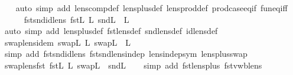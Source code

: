 \begin{isabellebody}
%
\isadelimproof
\ \ %
\endisadelimproof
%
\isatagproof
{}\isamarkupfalse%
\ {\isacharparenleft}auto\ simp\ add{\isacharcolon}\ lens{\isacharunderscore}comp{\isacharunderscore}def\ lens{\isacharunderscore}plus{\isacharunderscore}def\ lens{\isacharunderscore}prod{\isacharunderscore}def\ prod{\isachardot}case{\isacharunderscore}eq{\isacharunderscore}if\ fun{\isacharunderscore}eq{\isacharunderscore}iff{\isacharparenright}%
\endisatagproof
{\isafoldproof}%
%
\isadelimproof
\isanewline
%
\endisadelimproof
\ \ \ \ \isanewline
{}\isamarkupfalse%
\ fst{\isacharunderscore}snd{\isacharunderscore}id{\isacharunderscore}lens{\isacharcolon}\ {\isachardoublequoteopen}fst\isactrlsub L\ {\isacharplus}\isactrlsub L\ snd\isactrlsub L\ {\isacharequal}\ {}\isactrlsub L{\isachardoublequoteclose}\isanewline
%
\isadelimproof
\ \ %
\endisadelimproof
%
\isatagproof
{}\isamarkupfalse%
\ {\isacharparenleft}auto\ simp\ add{\isacharcolon}\ lens{\isacharunderscore}plus{\isacharunderscore}def\ fst{\isacharunderscore}lens{\isacharunderscore}def\ snd{\isacharunderscore}lens{\isacharunderscore}def\ id{\isacharunderscore}lens{\isacharunderscore}def{\isacharparenright}%
\endisatagproof
{\isafoldproof}%
%
\isadelimproof
\isanewline
%
\endisadelimproof
\ \ \isanewline
{}\isamarkupfalse%
\ swap{\isacharunderscore}lens{\isacharunderscore}idem{\isacharcolon}\ {\isachardoublequoteopen}swap\isactrlsub L\ {\isacharsemicolon}\isactrlsub L\ swap\isactrlsub L\ {\isacharequal}\ {}\isactrlsub L{\isachardoublequoteclose}\isanewline
%
\isadelimproof
\ \ %
\endisadelimproof
%
\isatagproof
{}\isamarkupfalse%
\ {\isacharparenleft}simp\ add{\isacharcolon}\ fst{\isacharunderscore}snd{\isacharunderscore}id{\isacharunderscore}lens\ fst{\isacharunderscore}snd{\isacharunderscore}lens{\isacharunderscore}indep\ lens{\isacharunderscore}indep{\isacharunderscore}sym\ lens{\isacharunderscore}plus{\isacharunderscore}swap{\isacharparenright}%
\endisatagproof
{\isafoldproof}%
%
\isadelimproof
\isanewline
%
\endisadelimproof
\isanewline
{}\isamarkupfalse%
\ swap{\isacharunderscore}lens{\isacharunderscore}fst{\isacharcolon}\ {\isachardoublequoteopen}fst\isactrlsub L\ {\isacharsemicolon}\isactrlsub L\ swap\isactrlsub L\ {\isacharequal}\ snd\isactrlsub L{\isachardoublequoteclose}\isanewline
%
\isadelimproof
\ \ %
\endisadelimproof
%
\isatagproof
{}\isamarkupfalse%
\ {\isacharparenleft}simp\ add{\isacharcolon}\ fst{\isacharunderscore}lens{\isacharunderscore}plus\ fst{\isacharunderscore}vwb{\isacharunderscore}lens{\isacharparenright}%

\end{isabellebody}
